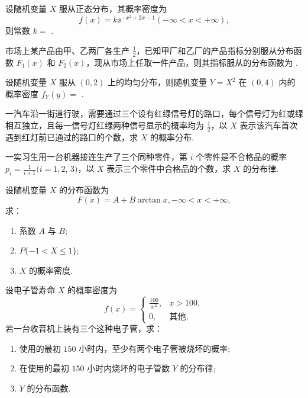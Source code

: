 	\begin{titwo}
		设随机变量 $X$ 服从正态分布，其概率密度为
		\[
			f(x) = k \ee^{-x^{2} + 2x - 1} (-\infty < x < +\infty),
		\]
		则常数 $k = $ \htwo.
	\end{titwo}

	\begin{titwo}
		市场上某产品由甲、乙两厂各生产 $\frac{1}{2}$，已知甲厂和乙厂的产品指标分别服从分布函数 $F_{1}(x)$ 和 $F_{2}(x)$，现从市场上任取一件产品，则其指标服从的分布函数为 \htwo.
	\end{titwo}

	\begin{titwo}
		设随机变量 $X$ 服从 $(0,2)$ 上的均匀分布，则随机变量 $Y = X^{2}$ 在 $(0,4)$ 内的概率密度 $f_{Y}(y) = $ \htwo.
	\end{titwo}

	\begin{titwo}
		一汽车沿一街道行驶，需要通过三个设有红绿信号灯的路口，每个信号灯为红或绿相互独立，且每一信号灯红绿两种信号显示的概率均为 $\frac{1}{2}$，以 $X$ 表示该汽车首次遇到红灯前已通过的路口的个数，求 $X$ 的概率分布.
	\end{titwo}

	\begin{titwo}
		一实习生用一台机器接连生产了三个同种零件，第 $i$ 个零件是不合格品的概率 $p_{i} = \frac{1}{i + 1} (i = 1,2$, $3)$，以 $X$ 表示三个零件中合格品的个数，求 $X$ 的分布律.
	\end{titwo}

	\begin{titwo}
		设随机变量 $X$ 的分布函数为
		\[
			F(x) = A + B \arctan x, -\infty < x < +\infty,
		\]
		求：
		\begin{enumerate}
			\item 系数 $A$ 与 $B$;
			\item $P\{ -1 < X \leq 1 \}$;
			\item $X$ 的概率密度.
		\end{enumerate}
	\end{titwo}

	\begin{titwo}
		设电子管寿命 $X$ 的概率密度为
		\[
			f(x) = \begin{cases}
				\frac{100}{x^{2}}, & x > 100, \\
				0, & \text{其他},
			\end{cases}
		\]
		若一台收音机上装有三个这种电子管，求：
		\begin{enumerate}
			\item 使用的最初 $150$ 小时内，至少有两个电子管被烧坏的概率;
			\item 在使用的最初 $150$ 小时内烧坏的电子管数 $Y$ 的分布律;
			\item $Y$ 的分布函数.
		\end{enumerate}
	\end{titwo}

